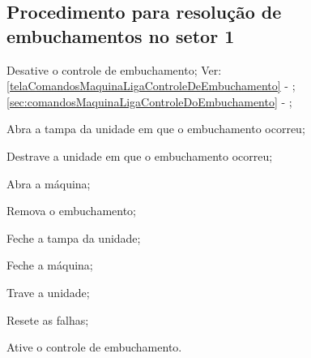 \ifmachineTypeFlexo
  \newpage
  \thispagestyle{fancy}
  \vspace*{40 pt}
\fi
\ifmachineTypeIcv

\subsection{Procedimento para resolução de embuchamentos no setor 1}



\begin{procedureFixingIsuesSector1}

  \item[\ding{\dingNumber}] Desative o controle de embuchamento; Ver: 
  \ifmachineTypeFlexo
  \ref{telaComandosMaquinaLigaControleDeEmbuchamento} - ;
  \fi
  \ifmachineTypeIcv
  \ref{sec:comandosMaquinaLigaControleDoEmbuchamento} - ;
  \fi
  \ifmachineTypeFlexo
  \item[\ding{\dingNumber}] Abra a tampa da unidade em que o embuchamento ocorreu;
  \fi
  \ifmachineTypeIcv
  \item[\ding{\dingNumber}] Destrave a unidade em que o embuchamento ocorreu;
  \item[\ding{\dingNumber}] Abra a máquina;
  \fi
  \item[\ding{\dingNumber}] Remova o embuchamento;
  \ifmachineTypeFlexo
  \item[\ding{\dingNumber}] Feche a tampa da unidade;
  \fi
  \ifmachineTypeIcv
  \item[\ding{\dingNumber}] Feche a máquina;
  \item[\ding{\dingNumber}] Trave a unidade;
  \fi
  \item[\ding{\dingNumber}] Resete as falhas;
  \item[\ding{\dingNumber}] Ative o controle de embuchamento.
  
\end{procedureFixingIsuesSector1}


